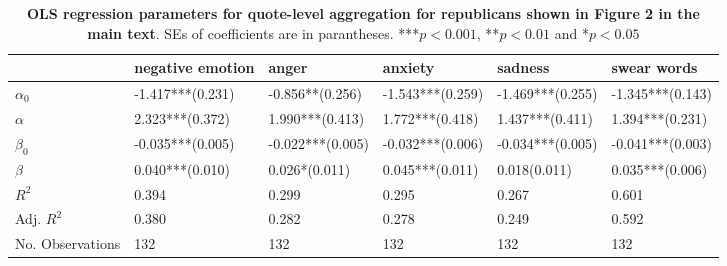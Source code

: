 \begin{table}[h]
\begin{adjustbox}{width=\linewidth, center}
\end{adjustbox}
	\end{table}

\begin{table}[h]\centering
\caption{\textbf{OLS regression parameters for quote-level aggregation for republicans shown in Figure 2 in the main text}. SEs of coefficients are in parantheses. ***$p < 0.001$, **$p < 0.01$ and *$p < 0.05$}
	\label{fig: Party_7}
\begin{adjustbox}{width=\linewidth, center}
	\begin{tabular}{llllll}
	\toprule
	{} &            negative emotion &                                           anger &                     anxiety &                                                   sadness &                 swear words \\
	\midrule
	$\alpha_0$       &            -1.417***(0.231) &                      -0.856**\phantom{*}(0.256) &            -1.543***(0.259) &                                          -1.469***(0.255) &            -1.345***(0.143) \\
	$\alpha$         &  \phantom{-}2.323***(0.372) &                      \phantom{-}1.990***(0.413) &  \phantom{-}1.772***(0.418) &                                \phantom{-}1.437***(0.411) &  \phantom{-}1.394***(0.231) \\
	$\beta_0$        &            -0.035***(0.005) &                                -0.022***(0.005) &            -0.032***(0.006) &                                          -0.034***(0.005) &            -0.041***(0.003) \\
	$\beta$          &  \phantom{-}0.040***(0.010) &  \phantom{-}0.026*\phantom{*}\phantom{*}(0.011) &  \phantom{-}0.045***(0.011) &  \phantom{-}0.018\phantom{*}\phantom{*}\phantom{*}(0.011) &  \phantom{-}0.035***(0.006) \\
	$R^2$            &                       0.394 &                                           0.299 &                       0.295 &                                                     0.267 &                       0.601 \\
	Adj. $R^2$       &                       0.380 &                                           0.282 &                       0.278 &                                                     0.249 &                       0.592 \\
	No. Observations &                         132 &                                             132 &                         132 &                                                       132 &                         132 \\
	\bottomrule
	\end{tabular}
	
\end{adjustbox}
	\end{table}

